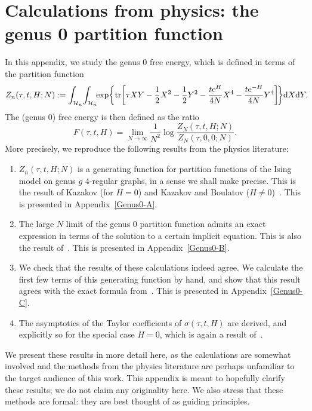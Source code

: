 \documentclass[10pt,a4paper]{amsart}
\DeclareMathOperator{\tr}{tr}
\numberwithin{equation}{section}
\begin{document}
\section[Calculations from physics: the genus $0$ partition function]{Calculations from physics: the genus $\boldsymbol{0}$ partition function}
In this appendix, we study the genus $0$ free energy, which is defined in terms of the partition function
\begin{align} \label{C2:2-matrix-partition function}
 Z_n(\tau,t,H;N) := \int_{\mathcal{H}_n}\!\int_{\mathcal{H}_n}\!\! \exp \biggl\{\tr \biggl[\tau XY - \frac{1}{2}X^2 -\frac{1}{2}Y^2 - \frac{t{\rm e}^H}{4N} X^4 - \frac{t{\rm e}^{-H}}{4N}Y^4\biggr]\!\biggr\} {\rm d}X{\rm d}Y.\!\!
 \end{align}
The (genus $0$) free energy is then defined as the ratio
 \begin{equation*}
 F(\tau,t,H) = \lim_{N\to \infty}\frac{1}{N^2}\log \frac{Z_N(\tau,t,H;N)}{Z_N(\tau,0,0;N)}.
 \end{equation*}
More precisely, we reproduce the following results from the physics literature:
 \begin{enumerate}\itemsep=0pt
 \item[$(1)$] $Z_n(\tau,t,H;N)$ is a generating function for partition functions of the Ising model on genus $g$ $4$-regular graphs, in a sense we shall make precise. This is the result of Kazakov (for $H=0$) and Kazakov and Boulatov ($H\neq 0$)~\cite{Kazakov2,Kazakov1}. This is presented in Appendix~\ref{Genus0-A}.
 \item[$(2)$] The large $N$ limit of the genus $0$ partition function admits an exact expression in terms of the solution to a certain implicit equation. This
 is also the result of~\cite{Kazakov2,Kazakov1}. This is presented in Appendix~\ref{Genus0-B}.
 \item[$(3)$] We check that the results of these calculations indeed agree. We calculate the first few terms of this generating function by hand, and show that this result agrees with the exact formula from~\cite{Kazakov2,Kazakov1}. This is presented in Appendix~\ref{Genus0-C}.
 \item[$(4)$] The asymptotics of the Taylor coefficients of $\sigma(\tau,t,H)$ are derived, and explicitly so for the special case $H=0$, which is again a result of~\cite{Kazakov1}.
 \end{enumerate}
We present these results in more detail here, as the calculations are somewhat involved and the methods from the physics literature are perhaps unfamiliar to the target audience of this work. This appendix is meant to hopefully clarify these results; we do not claim any originality here. We also stress that these methods are formal: they are best thought of as guiding principles.
\end{document}
